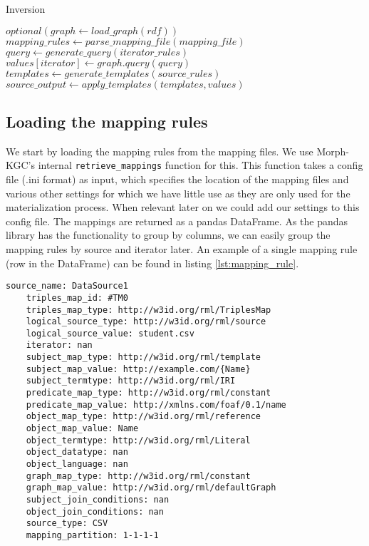 \begin{algorithm}
    \caption{Inversion}
    \label{alg:inversion}
    \begin{algorithmic}[1]
        \State $optional(graph \gets load\_graph(rdf))$
            \State $mapping\_rules \gets parse\_mapping\_file(mapping\_file)$
        \EndFor
                \State $query \gets generate\_query(iterator\_rules)$
                \State $values[iterator] \gets graph.query(query)$
            \EndFor
            \State $templates \gets generate\_templates(source\_rules)$
            \State $source\_output \gets apply\_templates(templates, values)$
        \EndFor
    \end{algorithmic}
\end{algorithm}

\subsection{Loading the mapping rules}
We start by loading the mapping rules from the mapping files. We use Morph-KGC's internal \texttt{retrieve\_mappings} function for this. This function takes a config file (.ini format) as input, which specifies the location of the mapping files and various other settings for which we have little use as they are only used for the materialization process. When relevant later on we could add our settings to this config file.
The mappings are returned as a pandas DataFrame. As the pandas library has the functionality to group by columns, we can easily group the mapping rules by source and iterator later. An example of a single mapping rule (row in the DataFrame) can be found in listing \ref{lst:mapping_rule}.

\begin{lstlisting}[caption={Example of a mapping rule in Morph-KGC}, label={lst:mapping_rule}, captionpos=b, basicstyle=\small]
    source_name: DataSource1 
    triples_map_id: #TM0
    triples_map_type: http://w3id.org/rml/TriplesMap
    logical_source_type: http://w3id.org/rml/source
    logical_source_value: student.csv
    iterator: nan
    subject_map_type: http://w3id.org/rml/template
    subject_map_value: http://example.com/{Name}
    subject_termtype: http://w3id.org/rml/IRI
    predicate_map_type: http://w3id.org/rml/constant
    predicate_map_value: http://xmlns.com/foaf/0.1/name
    object_map_type: http://w3id.org/rml/reference
    object_map_value: Name
    object_termtype: http://w3id.org/rml/Literal
    object_datatype: nan
    object_language: nan
    graph_map_type: http://w3id.org/rml/constant
    graph_map_value: http://w3id.org/rml/defaultGraph
    subject_join_conditions: nan
    object_join_conditions: nan
    source_type: CSV
    mapping_partition: 1-1-1-1
\end{lstlisting}

